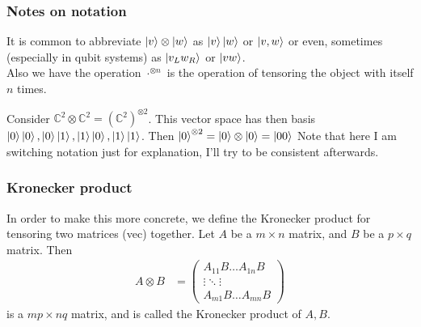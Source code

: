\documentclass{beamer}
\begin{document}
\begin{frame}
    \frametitle{Notes on notation}
    It is common to abbreviate $\ket{v} \otimes \ket{w}$ as $\ket{v}\ket{w}$ or $\ket{v, w}$ or even,
    sometimes (especially in qubit systems) as $\ket{v_L w_R}$ or $\ket{v w}$. \\
    Also we have the operation $\cdot^{\otimes n}$ is the operation of tensoring the object with itself $n$ times.
    \begin{example}
        Consider  $\mathbb{C}^2 \otimes \mathbb{C}^2 = (\mathbb{C}^2)^{\otimes 2}$.
        This vector space has then basis $\ket{0}\ket{0}, \ket{0}\ket{1}, \ket{1}\ket{0}, \ket{1}\ket{1}$.
        Then $\ket{0}^{\otimes 2} = \ket{0} \otimes \ket{0} = \ket{00}$
        Note that here I am switching notation just for explanation, I'll try to be consistent afterwards.
    \end{example}



\end{frame}
\begin{frame}
    \frametitle{Kronecker product}
    In order to make this more concrete, we define the Kronecker product for tensoring two matrices (vec) together.
    Let $A$ be a $m \times n$ matrix, and $B$ be a $p \times q$ matrix. Then
    \begin{align}
        A \otimes B & = \begin{pmatrix}
            A_{11} B \dots A_{1n} B \\
            \vdots \ddots \vdots    \\
            A_{m1} B \dots A_{mn} B
        \end{pmatrix}
    \end{align}
    is a $mp \times nq$ matrix, and is called the Kronecker product of $A, B$.

\end{frame}
\end{document}
